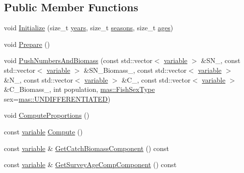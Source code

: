 \subsection*{Public Member Functions}
\begin{DoxyCompactItemize}
\item 
void \hyperlink{structmas_1_1_area_a21fe8830e100359433438c8241eefb01}{Initialize} (size\-\_\-t \hyperlink{structmas_1_1_area_a2a4e96c3f8817d242c50655f341083c0}{years}, size\-\_\-t \hyperlink{structmas_1_1_area_a45d133239182e8d71e2fd4d1ed1ba04f}{seasons}, size\-\_\-t \hyperlink{structmas_1_1_area_a9eec0d816a288d4c8afeb0e2dffa12df}{ages})
\item 
void \hyperlink{structmas_1_1_area_afb563772ce57ef8474346f933f8ace19}{Prepare} ()
\item 
void \hyperlink{structmas_1_1_area_aa1d33e6024732d606ab53b64dcac43cb}{Push\-Numbers\-And\-Biomass} (const std\-::vector$<$ \hyperlink{structmas_1_1_area_a3fb53ebc27c5323de15a81fbfbc7c878}{variable} $>$ \&S\-N\-\_\-, const std\-::vector$<$ \hyperlink{structmas_1_1_area_a3fb53ebc27c5323de15a81fbfbc7c878}{variable} $>$ \&S\-N\-\_\-\-Biomass\-\_\-, const std\-::vector$<$ \hyperlink{structmas_1_1_area_a3fb53ebc27c5323de15a81fbfbc7c878}{variable} $>$ \&N\-\_\-, const std\-::vector$<$ \hyperlink{structmas_1_1_area_a3fb53ebc27c5323de15a81fbfbc7c878}{variable} $>$ \&C\-\_\-, const std\-::vector$<$ \hyperlink{structmas_1_1_area_a3fb53ebc27c5323de15a81fbfbc7c878}{variable} $>$ \&C\-\_\-\-Biomass\-\_\-, int population, \hyperlink{namespacemas_a177aaabcef4ec0c3f390a7c9f6ad563b}{mas\-::\-Fish\-Sex\-Type} sex=\hyperlink{namespacemas_a177aaabcef4ec0c3f390a7c9f6ad563ba6afb238d6c6138b53f11ec1b44e92417}{mas\-::\-U\-N\-D\-I\-F\-F\-E\-R\-E\-N\-T\-I\-A\-T\-E\-D})
\item 
void \hyperlink{structmas_1_1_area_a76d23e8841d3359f0ec57b57b1766b97}{Compute\-Proportions} ()
\item 
const \hyperlink{structmas_1_1_area_a3fb53ebc27c5323de15a81fbfbc7c878}{variable} \hyperlink{structmas_1_1_area_aaff61be87f94ae8935798a97fa952969}{Compute} ()
\item 
const \hyperlink{structmas_1_1_area_a3fb53ebc27c5323de15a81fbfbc7c878}{variable} \& \hyperlink{structmas_1_1_area_ac02af6cd4a6b8bb7e49467bbdc53170b}{Get\-Catch\-Biomass\-Component} () const 
\item 
const \hyperlink{structmas_1_1_area_a3fb53ebc27c5323de15a81fbfbc7c878}{variable} \& \hyperlink{structmas_1_1_area_a9d931cc1786c247c2e02a0528785c103}{Get\-Survey\-Age\-Comp\-Component} () const 

\end{DoxyCompactItemize}
